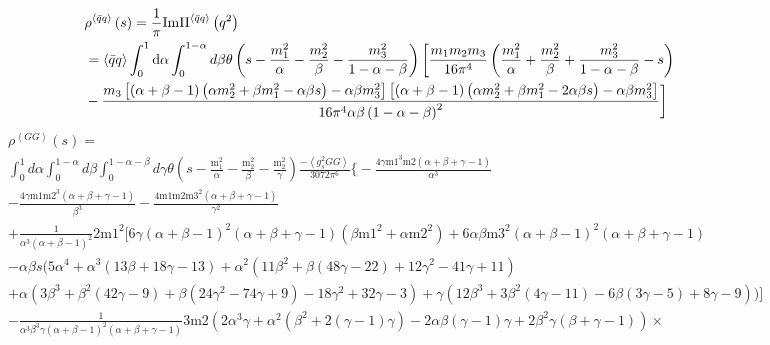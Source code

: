 \documentclass[prd,showpacs,showkeys,floatfix,amsmath,amssymb,floatfix,english]{revtex4}
\begin{document}
{\begin{align}
 & \rho^{\left\langle \bar{q}q\right\rangle }\left(s\right)=\frac{1}{\pi}\mathrm{Im}\Pi^{\left\langle \bar{q}q\right\rangle }\left(q^{2}\right)\nonumber \\
 & =\left\langle \bar{q}q\right\rangle \int_{0}^{1}{\rm d}\alpha\int_{0}^{1-\alpha}d\beta\theta\left(s-\frac{m_{1}^{2}}{\alpha}-\frac{m_{2}^{2}}{\beta}-\frac{m_{3}^{2}}{1-\alpha-\beta}\right)\biggl[\frac{m_{1}m_{2}m_{3}}{16\pi^{4}}\left(\frac{m_{1}^{2}}{\alpha}+\frac{m_{2}^{2}}{\beta}+\frac{m_{3}^{2}}{1-\alpha-\beta}-s\right)\nonumber \\
 & -\frac{m_{3}\left[\left(\alpha+\beta-1\right)\left(\alpha m_{2}^{2}+\beta m_{1}^{2}-\alpha\beta s\right)-\alpha\beta m_{3}^{2}\right]\left[\left(\alpha+\beta-1\right)\left(\alpha m_{2}^{2}+\beta m_{1}^{2}-2\alpha\beta s\right)-\alpha\beta m_{3}^{2}\right]}{16\pi^{4}\alpha\beta\left(1-\alpha-\beta\right)^{2}}\biggr]
\end{align}
}{\tiny{}
\begin{align}
 & \rho^{\left\langle GG\right\rangle }\left(s\right)=\nonumber \\
 & \int_{0}^{1}d\alpha\int_{0}^{1-\alpha}d\beta\int_{0}^{1-\alpha-\beta}d\gamma\theta\left(s-\frac{\text{m}_{1}^{2}}{\alpha}-\frac{\text{m}_{2}^{2}}{\beta}-\frac{\text{m}_{2}^{2}}{\gamma}\right)\frac{-\left\langle g_{s}^{2}GG\right\rangle }{3072\pi^{6}}\biggl\{-\frac{4\gamma\text{m1}^{3}\text{m2}(\alpha+\beta+\gamma-1)}{\alpha^{3}}\nonumber \\
 & -\frac{4\gamma\text{m1}\text{m2}^{3}(\alpha+\beta+\gamma-1)}{\beta^{3}}-\frac{4\text{m1}\text{m2}\text{m3}^{2}(\alpha+\beta+\gamma-1)}{\gamma^{2}}\nonumber \\
 & +\frac{1}{\alpha^{3}(\alpha+\beta-1)^{2}}2\text{m1}^{2}\biggl[6\gamma(\alpha+\beta-1)^{2}(\alpha+\beta+\gamma-1)\left(\beta\text{m1}^{2}+\alpha\text{m2}^{2}\right)+6\alpha\beta\text{m3}^{2}(\alpha+\beta-1)^{2}(\alpha+\beta+\gamma-1)\nonumber \\
 & -\alpha\beta s\biggl(5\alpha^{4}+\alpha^{3}(13\beta+18\gamma-13)+\alpha^{2}\left(11\beta^{2}+\beta(48\gamma-22)+12\gamma^{2}-41\gamma+11\right)\nonumber \\
 & +\alpha\left(3\beta^{3}+\beta^{2}(42\gamma-9)+\beta\left(24\gamma^{2}-74\gamma+9\right)-18\gamma^{2}+32\gamma-3\right)+\gamma\left(12\beta^{3}+3\beta^{2}(4\gamma-11)-6\beta(3\gamma-5)+8\gamma-9\right)\biggr)\biggr]\nonumber \\
 & -\frac{1}{\alpha^{3}\beta^{3}\gamma(\alpha+\beta-1)^{2}(\alpha+\beta+\gamma-1)}3\text{m2}\left(2\alpha^{3}\gamma+\alpha^{2}\left(\beta^{2}+2(\gamma-1)\gamma\right)-2\alpha\beta(\gamma-1)\gamma+2\beta^{2}\gamma(\beta+\gamma-1)\right)\times\nonumber \\

\end{align}}
\end{document}
